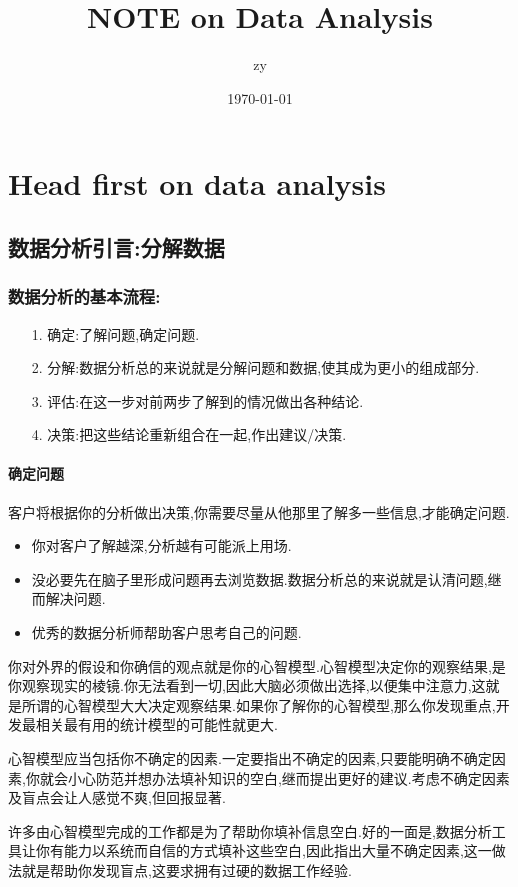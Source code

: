 \documentclass[11pt,a4paper,oneside]{book}
\title{\huge NOTE on Data Analysis}
\author{zy}
\date{\today}
\begin{document}
\maketitle
\tableofcontents  %
\part{Head first on data analysis}
\chapter{数据分析引言:分解数据} 
\section{数据分析的基本流程:}
\begin{enumerate}
	\item[1.]确定:了解问题,确定问题.
	\item[2.]分解:数据分析总的来说就是分解问题和数据,使其成为更小的组成部分.
	\item[3.]评估:在这一步对前两步了解到的情况做出各种结论.
	\item[4.]决策:把这些结论重新组合在一起,作出建议/决策.
\end{enumerate} 
\subsection{确定问题}
客户将根据你的分析做出决策,你需要尽量从他那里了解多一些信息,才能确定问题.

\begin{itemize}
	\item 你对客户了解越深,分析越有可能派上用场.
	\item 没必要先在脑子里形成问题再去浏览数据.数据分析总的来说就是认清问题,继而解决问题.
	\item 优秀的数据分析师帮助客户思考自己的问题.
\end{itemize}

你对外界的假设和你确信的观点就是你的心智模型.心智模型决定你的观察结果,是你观察现实的棱镜.你无法看到一切,因此大脑必须做出选择,以便集中注意力,这就是所谓的心智模型大大决定观察结果.如果你了解你的心智模型,那么你发现重点,开发最相关最有用的统计模型的可能性就更大.

心智模型应当包括你不确定的因素.一定要指出不确定的因素,只要能明确不确定因素,你就会小心防范并想办法填补知识的空白,继而提出更好的建议.考虑不确定因素及盲点会让人感觉不爽,但回报显著.

许多由心智模型完成的工作都是为了帮助你填补信息空白.好的一面是,数据分析工具让你有能力以系统而自信的方式填补这些空白,因此指出大量不确定因素,这一做法就是帮助你发现盲点,这要求拥有过硬的数据工作经验.
\end{document}
